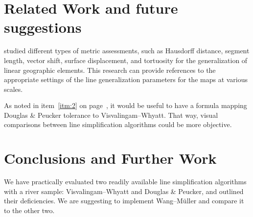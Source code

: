 \documentclass[a4paper]{article}
\newcommand{\DP}{Douglas \& Peucker}
\newcommand{\VW}{Visvalingam--Whyatt}
\newcommand{\WM}{Wang--M{\"u}ller}
\begin{document}
\section{Related Work and future suggestions}
\label{sec:related_work}

\cite{stanislawski2012automated} studied different types of metric assessments,
such as Hausdorff distance, segment length, vector shift, surface displacement,
and tortuosity for the generalization of linear geographic elements. This
research can provide references to the appropriate settings of the line
generalization parameters for the maps at various scales.

As noted in item~\ref{itm:2} on page~\pageref{itm:2}, it would be useful to
have a formula mapping {\DP} tolerance to {\VW}. That way, visual comparisons
between line simplification algorithms could be more objective.

\section{Conclusions and Further Work}
\label{sec:conclusions_and_further_work}

We have practically evaluated two readily available line simplification
algorithms with a river sample: {\VW} and {\DP}, and outlined their
deficiencies. We are suggesting to implement {\WM} and compare it to the other
two.

\printbibliography
\end{document}
